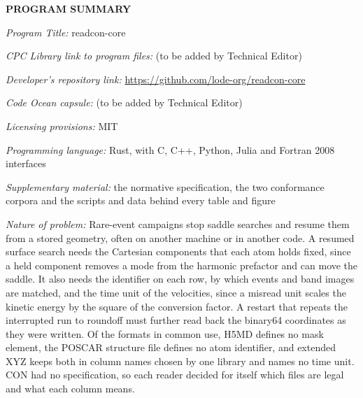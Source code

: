 \documentclass[preprint,12pt]{elsarticle}
\begin{document}
\noindent\textbf{PROGRAM SUMMARY}

\begin{small} \noindent\textit{Program Title:} readcon-core

\noindent\textit{CPC Library link to program files:} (to be added by Technical Editor)

\noindent\textit{Developer's repository link:} \url{https://github.com/lode-org/readcon-core}

\noindent\textit{Code Ocean capsule:} (to be added by Technical Editor)

\noindent\textit{Licensing provisions:} MIT

\noindent\textit{Programming language:} Rust, with C, C++, Python, Julia and Fortran 2008 interfaces

\noindent\textit{Supplementary material:} the normative specification, the two conformance corpora and the scripts and data behind every table and figure

\textit{Nature of problem:} Rare-event campaigns stop saddle searches and resume them from a stored geometry, often on another machine or in another code.
A resumed surface search needs the Cartesian components that each atom holds fixed, since a held component removes a mode from the harmonic prefactor and can move the saddle.
It also needs the identifier on each row, by which events and band images are matched, and the time unit of the velocities, since a misread unit scales the kinetic energy by the square of the conversion factor.
A restart that repeats the interrupted run to roundoff must further read back the binary64 coordinates as they were written.
Of the formats in common use, H5MD defines no mask element, the POSCAR structure file defines no atom identifier, and extended XYZ keeps both in column names chosen by one library and names no time unit.
CON had no specification, so each reader decided for itself which files are legal and what each column means.


\end{small}
\end{document}
